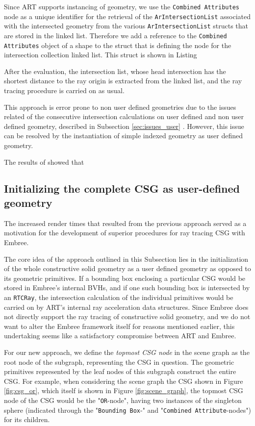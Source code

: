 Since ART supports instancing of geometry, we use the \texttt{Combined Attributes} node as a unique identifier for the retrieval of the \texttt{ArIntersectionList} associated with the intersected geometry from the various \texttt{ArIntersectionList} structs that are stored in the linked list.
Therefore we add a reference to the \texttt{Combined Attributes} object of a shape to the struct that is defining the node for the intersection collection linked list. This struct is shown in Listing 

After the evaluation, the intersection list, whose head intersection has the shortest distance to the ray origin is extracted from the linked list, and the ray tracing procedure is carried on as usual.

This approach is error prone to non user defined geometries due to the issues related of the consecutive intersection calculations on user defined and non user defined geometry, described in Subsection \ref{sec:issues_user} . However, this issue can be resolved by the instantiation of simple indexed geometry as user defined geometry.

The results of \cite{karaffova2016} showed that


\subsection{Initializing the complete CSG as user-defined geometry}
\label{subsec:apprach2}

The increased render times that resulted from the previous approach served as a motivation for the development of superior procedures for ray tracing CSG with Embree. 

The core idea of the approach outlined in this Subsection lies in the initialization of the whole constructive solid geometry as a user defined geometry as opposed to its geometric primitives. If a bounding box enclosing a particular CSG would be stored in Embree's internal BVHs, and if one such bounding box is intersected by an \texttt{RTCRay}, the intersection calculation of the individual primitives would be carried on by ART's internal ray acceleration data structures. Since Embree does not directly support the ray tracing of constructive solid geometry, and we do not want to alter the Embree framework itself for reasons mentioned earlier, this undertaking seems like a satisfactory compromise between ART and Embree.

For our new approach, we define the \emph{topmost CSG node} in the scene graph as the root node of the subgraph, representing the CSG in question. The geometric primitives represented by the leaf nodes of this subgraph construct the entire CSG. For example, when considering the scene graph the CSG shown in Figure \ref{fig:csg_or}, which itself is shown in Figure \ref{fig:scene_graph}, the topmost CSG node of the CSG would be the "\texttt{OR}-node", having two instances of the singleton sphere (indicated through the "\texttt{Bounding Box}-" and "\texttt{Combined Attribute}-nodes") for its children.

